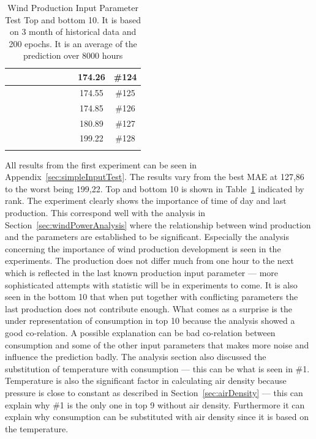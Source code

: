 \begin{center}
\begin{longtable}{|c|c|c|c|c|c|c|c|c|c|}
 \x &  \x &  \x &  \x &  \x &  \x &  \x &  \x & 174.26 & \#124 \\ \hline
 \x &  \x &  &  \x &  &  \x &  \x &  \x & 174.55 & \#125 \\ \hline
 \x &  &  &  \x &  &  \x &  \x &  \x & 174.85 & \#126 \\ \hline
 \x &  \x &  \x &  &  \x &  \x &  \x &  & 180.89 & \#127 \\ \hline
 \x &  \x &  &  &  \x &  \x &  \x &  \x & 199.22 & \#128 \\ \hline
\caption{Wind Production Input Parameter Test Top and bottom 10. It is based on 3 month of historical data and 200 epochs. It is an average of the prediction over 8000 hours}
\label{table:windProdInputParamsTop10}
\end{longtable}
\end{center}
\normalsize

All results from the first experiment can be seen in Appendix~\ref{sec:simpleInputTest}. The results vary from the best MAE at 127,86 to the worst being 199,22. Top and bottom 10 is shown in Table~\ref{table:windProdInputParamsTop10} indicated by rank. The experiment clearly shows the importance of time of day and last production. This correspond well with the analysis in Section~\ref{sec:windPowerAnalysis} where the relationship between wind production and the parameters are established to be significant. Especially the analysis concerning the importance of wind production development is  seen in the experiments. The production does not differ much from one hour to the next which is reflected in the last known production input parameter --- more sophisticated attempts with statistic will be in experiments to come. It is also seen in the bottom 10 that when put together with conflicting parameters the last production does not contribute enough.  What comes as a surprise is the under representation of consumption in top 10 because the analysis showed a good co-relation. A possible explanation can be bad co-relation between consumption and some of the other input parameters that makes more noise and influence the prediction badly. The analysis section also discussed the substitution of temperature with consumption --- this can be what is seen in \#1. Temperature is also the significant factor in calculating air density because pressure is close to constant as described in Section~\ref{sec:airDensity} --- this can explain why \#1 is the only one in top 9 without air density. Furthermore it can explain why consumption can be substituted with air density since it is based on the temperature.

